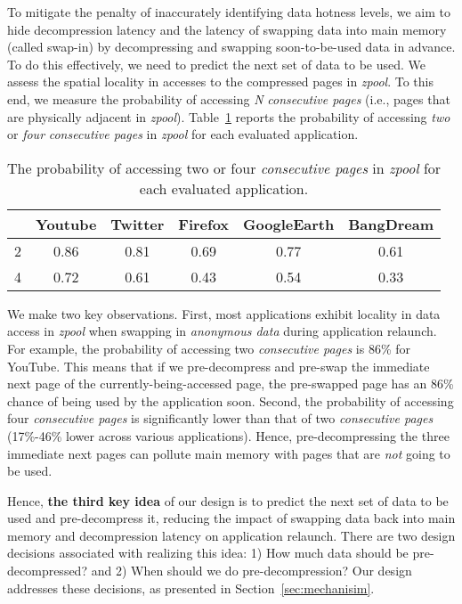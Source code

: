 To mitigate the penalty of inaccurately identifying data hotness levels, we aim to hide decompression latency and the latency of swapping data into main memory (called swap-in) by decompressing and swapping soon-to-be-used data in advance. To do this effectively, we need to predict the next set of data to be used. We assess the spatial locality in accesses to the compressed pages in \emph{zpool}. To this end, we measure the probability of accessing \emph{N} \emph{consecutive pages} (i.e., pages that are physically adjacent in \emph{zpool}). 
Table~\ref{tab:locality} reports the probability of accessing \emph{two} or \emph{four} \emph{consecutive pages} in \emph{zpool} for each evaluated application.


\begin{table}[h!]
\centering
\caption{The probability
of accessing two or four \emph{consecutive pages} in \emph{zpool} for each
evaluated application.}
\footnotesize
\begin{tabular}{c|c|c|c|c|c}
\hline
 &\textbf{Youtube}& \textbf{ Twitter}&\textbf{Firefox}&\textbf{GoogleEarth}&\textbf{BangDream}\\
 \hline
 \hline
 2&0.86&0.81&0.69&0.77&0.61\\
 \hline
 4&0.72&0.61&0.43&0.54&0.33\\
\hline
\end{tabular}
\label{tab:locality}
\end{table}


We make two key observations. First, most applications exhibit locality in data access in  \emph{zpool} when swapping in \emph{anonymous data} during application relaunch. For example, the probability of accessing two \emph{consecutive pages} is 86\% for YouTube. This means that if we pre-decompress and pre-swap the immediate next page of the currently-being-accessed page, 
the pre-swapped page has an 86\% chance of being used by the application soon. 
Second, the probability of accessing four \emph{consecutive pages} is significantly lower than that of two \emph{consecutive pages} (17\%-46\% lower across various applications). Hence, pre-decompressing the three immediate next pages can pollute main memory with pages that are \emph{not} going to be used.


Hence, \textbf{the third key idea} of our design is to predict the next set of data to be used and pre-decompress it, reducing the impact of swapping data back into main memory and decompression latency on application relaunch. There are two design decisions associated with realizing this idea: 1) How much data should be pre-decompressed? and 2) When should we do pre-decompression? Our design addresses these decisions, as presented in Section~\ref{sec:mechanisim}.


